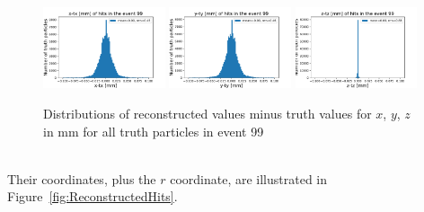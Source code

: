 \begin{figure}[htb]
\centering
\includegraphics[width=0.32\textwidth]{plots/DataExploration_x_tx.pdf}
\includegraphics[width=0.32\textwidth]{plots/DataExploration_y_ty.pdf}
\includegraphics[width=0.32\textwidth]{plots/DataExploration_z_tz.pdf}
\caption{Distributions of reconstructed values minus truth values for $x$, $y$, $z$ in mm for all truth particles in event 99}
\label{fig:ReconstructedToTruthHits}
\end{figure}

\ \\Their coordinates, plus the $r$ coordinate, are illustrated in Figure~\ref{fig:ReconstructedHits}. 

